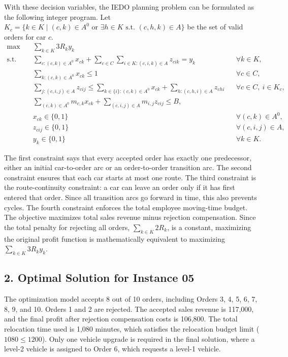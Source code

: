 \documentclass[10pt,a4paper]{article}
\begin{document}
With these decision variables, the IEDO planning problem can be formulated as
the following integer program. Let $K_c = \{ k \in K \mid (c,k) \in A^0 \text{ or } \exists h \in K \text{ s.t. } (c,h,k) \in A \}$ be the set of valid orders for car $c$.
\[
\begin{aligned}
\max \quad
& \sum_{k\in K} 3 R_k y_k \\
\text{s.t.}\quad
& \sum_{c:(c,k)\in A^0}x_{ck}
  + \sum_{c \in C}\sum_{i \in K:(c,i,k)\in A}z_{cik}
  = y_k
  && \forall k\in K,\\
& \sum_{k:(c,k)\in A^0}x_{ck}\le 1
  && \forall c\in C,\\
& \sum_{j:(c,i,j)\in A}z_{cij}
  \le \sum_{k \in \{i\} : (c,k) \in A^0}x_{ck}+\sum_{h:(c,h,i)\in A}z_{chi}
  && \forall c\in C,\ i\in K_c,\\
& \sum_{(c,k)\in A^0}m_{c,k}x_{ck}
  +\sum_{(c,i,j)\in A}m_{i,j}z_{cij}
  \le B,\\
& x_{ck}\in\{0,1\}
  && \forall (c,k)\in A^0,\\
& z_{cij}\in\{0,1\}
  && \forall (c,i,j)\in A,\\
& y_k\in\{0,1\}
  && \forall k\in K.
\end{aligned}
\]

The first constraint says that every accepted order has exactly one predecessor,
either an initial car-to-order arc or an order-to-order transition arc.  The
second constraint ensures that each car starts at most one route.  The third
constraint is the route-continuity constraint: a car can leave an order only if
it has first entered that order.  Since all transition arcs go forward in time,
this also prevents cycles.  The fourth constraint enforces the total employee
moving-time budget.  The objective maximizes total sales revenue minus rejection
compensation. Since the total penalty for rejecting all orders, $\sum_{k\in K} 2R_k$,
is a constant, maximizing the original profit function is mathematically equivalent
to maximizing $\sum_{k\in K} 3R_k y_k$.

\vspace{0.3cm}

\subsection*{2. Optimal Solution for Instance 05}

\hspace{2em} The optimization model accepts 8 out of 10 orders, including Orders 3, 4, 5, 6, 7, 8, 9, and 10. Orders 1 and 2 are rejected. The accepted sales revenue is 117,000, and the final profit after rejection compensation costs is 106,800. The total relocation time used is 1,080 minutes, which satisfies the relocation budget limit ($1080 \le 1200$). Only one vehicle upgrade is required in the final solution, where a level-2 vehicle is assigned to Order 6, which requests a level-1 vehicle.
\end{document}
